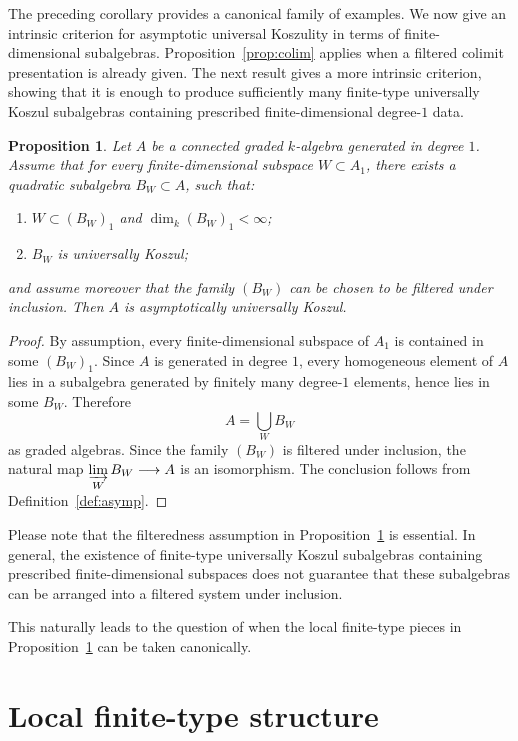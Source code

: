 \documentclass[11pt]{amsart}
\numberwithin{equation}{section}
\newtheorem{proposition}[theorem]{Proposition}
\theoremstyle{definition}
\begin{document}
	
	The preceding corollary provides a canonical family of examples. We now give an intrinsic criterion for asymptotic universal Koszulity in terms of finite-dimensional subalgebras. Proposition~\ref{prop:colim} applies when a filtered colimit presentation is already given. The next result gives a more intrinsic criterion, showing that it is enough to produce sufficiently many finite-type universally Koszul subalgebras containing prescribed finite-dimensional degree-$1$ data.
	
	
	\begin{proposition}\label{prop:local}
		Let \(A\) be a connected graded $k$-algebra generated in degree \(1\). Assume that for every finite-dimensional subspace \(W \subset A_1\), there exists a quadratic subalgebra \(B_W \subset A\), such that:
		\begin{enumerate}[label=(\alph*)]
			\item \(W \subset (B_W)_1\) and \(\dim_k (B_W)_1 < \infty\);
			\item \(B_W\) is universally Koszul;
		\end{enumerate}
		and assume moreover that the family \((B_W)\) can be chosen to be filtered under inclusion. Then \(A\) is asymptotically universally Koszul.
	\end{proposition}
	
	\begin{proof}
		By assumption, every finite-dimensional subspace of \(A_1\) is contained in some \((B_W)_1\). Since \(A\) is generated in degree \(1\), every homogeneous element of \(A\) lies in a subalgebra generated by finitely many degree-$1$ elements, hence lies in some \(B_W\). Therefore \[ A =\bigcup_W B_W \] as graded algebras. Since the family \((B_W)\) is filtered under inclusion,	the natural map \(\displaystyle \varinjlim_W B_W \longrightarrow A\) is an isomorphism. The conclusion follows from Definition~\ref{def:asymp}.
	\end{proof}
	
	Please note that the filteredness assumption in Proposition~\ref{prop:local} is essential. In general, the existence of finite-type universally Koszul subalgebras containing prescribed finite-dimensional subspaces does not guarantee that these subalgebras can be arranged into a filtered system under inclusion.
	
	This naturally leads to the question of when the local finite-type pieces in Proposition~\ref{prop:local} can be taken canonically.
	
	
	\section{Local finite-type structure}
	\label{sec:local}
	
\end{document}

